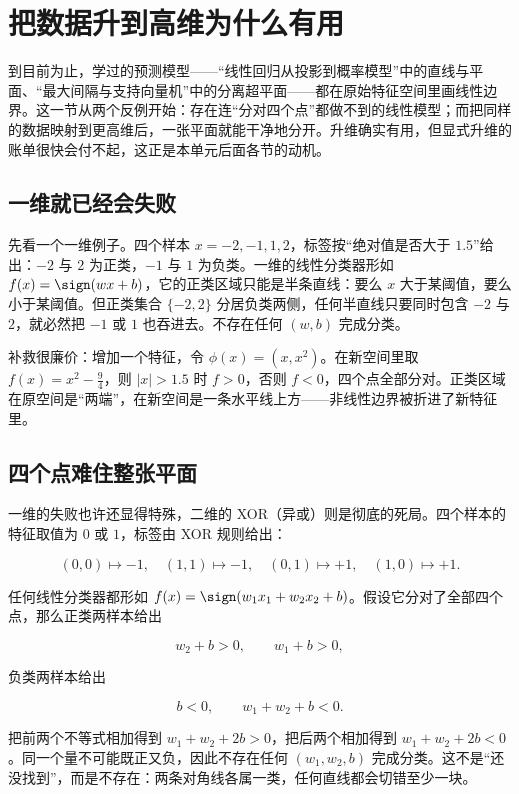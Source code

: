 \section{把数据升到高维为什么有用}

到目前为止，学过的预测模型——``线性回归从投影到概率模型''中的直线与平面、``最大间隔与支持向量机''中的分离超平面——都在原始特征空间里画线性边界。这一节从两个反例开始：存在连``分对四个点''都做不到的线性模型；而把同样的数据映射到更高维后，一张平面就能干净地分开。升维确实有用，但显式升维的账单很快会付不起，这正是本单元后面各节的动机。

\subsection{一维就已经会失败}

先看一个一维例子。四个样本 \(x=-2,-1,1,2\)，标签按``绝对值是否大于 \(1.5\)''给出：\(-2\) 与 \(2\) 为正类，\(-1\) 与 \(1\) 为负类。一维的线性分类器形如 \(f(x)=\sign(wx+b)\)，它的正类区域只能是半条直线：要么 \(x\) 大于某阈值，要么小于某阈值。但正类集合 \(\{-2,2\}\) 分居负类两侧，任何半直线只要同时包含 \(-2\) 与 \(2\)，就必然把 \(-1\) 或 \(1\) 也吞进去。不存在任何 \((w,b)\) 完成分类。

补救很廉价：增加一个特征，令 \(\phi(x)=(x,x^2)\)。在新空间里取 \(f(x)=x^2-\tfrac94\)，则 \(|x|>1.5\) 时 \(f>0\)，否则 \(f<0\)，四个点全部分对。正类区域在原空间是``两端''，在新空间是一条水平线上方——非线性边界被折进了新特征里。

\subsection{四个点难住整张平面}

一维的失败也许还显得特殊，二维的 XOR（异或）则是彻底的死局。四个样本的特征取值为 \(0\) 或 \(1\)，标签由 XOR 规则给出：

\[
(0,0)\mapsto -1,\quad
(1,1)\mapsto -1,\quad
(0,1)\mapsto +1,\quad
(1,0)\mapsto +1.
\]

任何线性分类器都形如 \(f(x)=\sign(w_1x_1+w_2x_2+b)\)。假设它分对了全部四个点，那么正类两样本给出

\[
w_2+b>0,\qquad w_1+b>0,
\]

负类两样本给出

\[
b<0,\qquad w_1+w_2+b<0.
\]

把前两个不等式相加得到 \(w_1+w_2+2b>0\)，把后两个相加得到 \(w_1+w_2+2b<0\)。同一个量不可能既正又负，因此不存在任何 \((w_1,w_2,b)\) 完成分类。这不是``还没找到''，而是不存在：两条对角线各属一类，任何直线都会切错至少一块。

